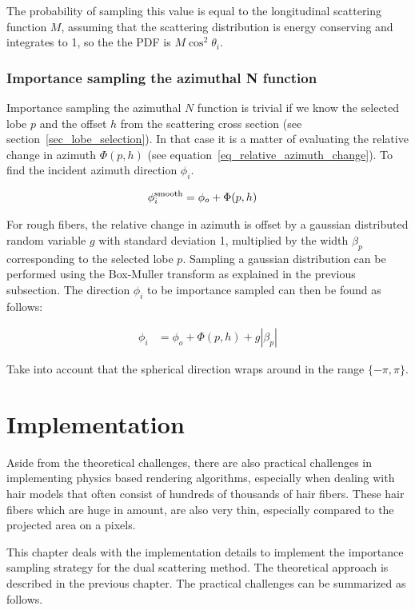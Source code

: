 \documentclass[11pt,a4paper]{report}
\begin{document}
The probability of sampling this value is equal to the longitudinal scattering function $M$, assuming that the scattering distribution is energy conserving and integrates to 1, so the the PDF is $M \cos^2 \theta_i$.

\subsection{Importance sampling the azimuthal N function}

Importance sampling the azimuthal $N$ function is trivial if we know the selected lobe $p$ and the offset $h$ from the scattering cross section (see section~\ref{sec_lobe_selection}). In that case it is a matter of evaluating the relative change in azimuth $\Phi(p, h)$ (see equation~\ref{eq_relative_azimuth_change}). To find the incident azimuth direction $\phi_i$.

\begin{align}
\label{phi_func}
\phi_i^{\textnormal{smooth}} &= \phi_o + \Phi(p, h)
\end{align}

For rough fibers, the relative change in azimuth is offset by a gaussian distributed random variable $g$ with standard deviation 1, multiplied by the width $\beta_p$ corresponding to the selected lobe $p$. Sampling a gaussian distribution can be performed using the Box-Muller transform as explained in the previous subsection. The direction $\phi_i$ to be importance sampled can then be found as follows:

\begin{align}
\phi_i &= \phi_o + \Phi(p, h) + g | \beta_p | 
\end{align}

Take into account that the spherical direction wraps around in the range $\{ -\pi, \pi \}$.


\chapter{Implementation}
\label{chapter_implementation}

Aside from the theoretical challenges, there are also practical challenges in implementing physics based rendering algorithms, especially when dealing with hair models that often consist of hundreds of thousands of hair fibers. These hair fibers which are huge in amount, are also very thin, especially compared to the projected area on a pixels.

This chapter deals with the implementation details to implement the importance sampling strategy for the dual scattering method. The theoretical approach is described in the previous chapter. The practical challenges can be summarized as follows.
\end{document}
